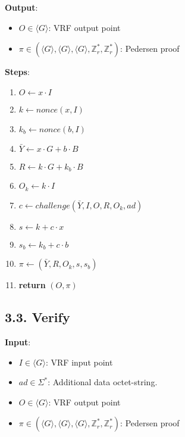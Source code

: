 \documentclass[
]{article}
\providecommand{\tightlist}{%
  \setlength{\itemsep}{0pt}\setlength{\parskip}{0pt}}
\begin{document}
\textbf{Output}:

\begin{itemize}
\tightlist
\item
  \(O \in \langle G \rangle\): VRF output point
\item
  \(\pi \in (\langle G \rangle, \langle G \rangle, \langle G \rangle, \mathbb{Z}^*_r, \mathbb{Z}^*_r)\):
  Pedersen proof
\end{itemize}

\textbf{Steps}:

\begin{enumerate}
\def\labelenumi{\arabic{enumi}.}
\tightlist
\item
  \(O \leftarrow x \cdot I\)
\item
  \(k \leftarrow nonce(x, I)\)
\item
  \(k_b \leftarrow nonce(b, I)\)
\item
  \(\bar{Y} \leftarrow x \cdot G + b \cdot B\)
\item
  \(R \leftarrow k \cdot G + k_b \cdot B\)
\item
  \(O_k \leftarrow k \cdot I\)
\item
  \(c \leftarrow challenge(\bar{Y}, I, O, R, O_k, ad)\)
\item
  \(s \leftarrow k + c \cdot x\)
\item
  \(s_b \leftarrow k_b + c \cdot b\)
\item
  \(\pi \leftarrow (\bar{Y}, R, O_k, s, s_b)\)
\item
  \textbf{return} \((O, \pi)\)
\end{enumerate}

\hypertarget{verify-1}{%
\subsection{3.3. Verify}\label{verify-1}}

\textbf{Input}:

\begin{itemize}
\tightlist
\item
  \(I \in \langle G \rangle\): VRF input point
\item
  \(ad \in \Sigma^*\): Additional data octet-string.
\item
  \(O \in \langle G \rangle\): VRF output point
\item
  \(\pi \in (\langle G \rangle, \langle G \rangle, \langle G \rangle, \mathbb{Z}^*_r, \mathbb{Z}^*_r)\):
  Pedersen proof
\end{itemize}
\end{document}
